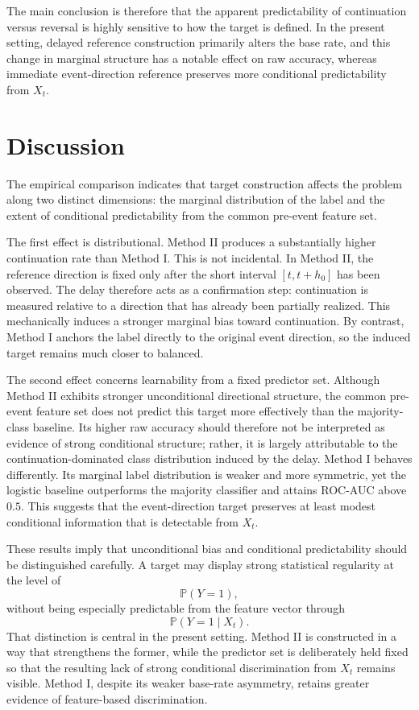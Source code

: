 \documentclass[11pt,a4paper]{article}
\begin{document}
	The main conclusion is therefore that the apparent predictability of continuation versus reversal is highly sensitive to how the target is defined. In the present setting, delayed reference construction primarily alters the base rate, and this change in marginal structure has a notable effect on raw accuracy, whereas immediate event-direction reference preserves more conditional predictability from \(X_t\).
		
		\section{Discussion}

		The empirical comparison indicates that target construction affects the problem along two distinct dimensions: the marginal distribution of the label and the extent of conditional predictability from the common pre-event feature set.

		The first effect is distributional. Method II produces a substantially higher continuation rate than Method I. This is not incidental. In Method II, the reference direction is fixed only after the short interval \([t,t+h_0]\) has been observed. The delay therefore acts as a confirmation step: continuation is measured relative to a direction that has already been partially realized. This mechanically induces a stronger marginal bias toward continuation. By contrast, Method I anchors the label directly to the original event direction, so the induced target remains much closer to balanced.

		The second effect concerns learnability from a fixed predictor set. Although Method II exhibits stronger unconditional directional structure, the common pre-event feature set does not predict this target more effectively than the majority-class baseline. Its higher raw accuracy should therefore not be interpreted as evidence of strong conditional structure; rather, it is largely attributable to the continuation-dominated class distribution induced by the delay. Method I behaves differently. Its marginal label distribution is weaker and more symmetric, yet the logistic baseline outperforms the majority classifier and attains ROC-AUC above \(0.5\). This suggests that the event-direction target preserves at least modest conditional information that is detectable from \(X_t\).

		These results imply that unconditional bias and conditional predictability should be distinguished carefully. A target may display strong statistical regularity at the level of
		\[
		\mathbb{P}(Y=1),
		\]
		without being especially predictable from the feature vector through
		\[
		\mathbb{P}(Y=1 \mid X_t).
		\]
		That distinction is central in the present setting. Method II is constructed in a way that strengthens the former, while the predictor set is deliberately held fixed so that the resulting lack of strong conditional discrimination from \(X_t\) remains visible. Method I, despite its weaker base-rate asymmetry, retains greater evidence of feature-based discrimination.
\end{document}
